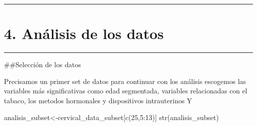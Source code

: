 \documentclass[
]{article}
\newenvironment{Shaded}{\begin{snugshade}}{\end{snugshade}}
\newcommand{\AttributeTok}[1]{\textcolor[rgb]{0.80,0.80,0.80}{#1}}
\newcommand{\DecValTok}[1]{\textcolor[rgb]{0.86,0.86,0.80}{#1}}
\newcommand{\FunctionTok}[1]{\textcolor[rgb]{0.94,0.94,0.56}{#1}}
\newcommand{\NormalTok}[1]{\textcolor[rgb]{0.80,0.80,0.80}{#1}}
\newcommand{\OtherTok}[1]{\textcolor[rgb]{0.94,0.94,0.56}{#1}}
\newcommand{\SpecialCharTok}[1]{\textcolor[rgb]{0.86,0.64,0.64}{#1}}
\newcommand{\StringTok}[1]{\textcolor[rgb]{0.80,0.58,0.58}{#1}}
\begin{document}
\begin{Shaded}
\end{Shaded}

\begin{center}\rule{0.5\linewidth}{0.5pt}\end{center}

\hypertarget{anuxe1lisis-de-los-datos}{%
\section{4. Análisis de los datos}\label{anuxe1lisis-de-los-datos}}

\begin{center}\rule{0.5\linewidth}{0.5pt}\end{center}

\#\#Selección de los datos

Precisamos un primer set de datos para continuar con los análisis
escogemos las variables más significativas como edad segmentada,
variables relacionadas con el tabaco, los metodos hormonales y
dispositivos intrauterinos Y

\begin{Shaded}
\begin{Highlighting}[]
\NormalTok{analisis\_subset}\OtherTok{\textless{}{-}}\NormalTok{cervical\_data\_subset[}\FunctionTok{c}\NormalTok{(}\DecValTok{25}\NormalTok{,}\DecValTok{5}\SpecialCharTok{:}\DecValTok{13}\NormalTok{)]}
\FunctionTok{str}\NormalTok{(analisis\_subset)}
\end{Highlighting}
\end{Shaded}
\end{document}
